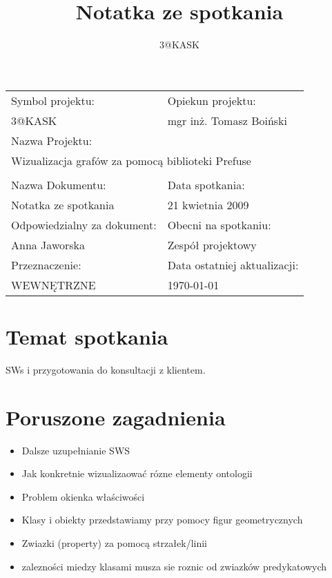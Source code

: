 \documentclass[a4paper,10pt]{article}
\title{Notatka ze spotkania}
\author{3@KASK}
\begin{document}



\maketitle


\begin{center}
\begin{tabular}{|p{7cm}|p{7cm}|}
\hline
Symbol projektu: & Opiekun projektu:   \tabularnewline 
3@KASK & mgr inż. Tomasz Boiński    \tabularnewline \hline
\multicolumn{2}{|l|}{Nazwa Projektu: } \tabularnewline
\multicolumn{2}{|l|}{Wizualizacja grafów za pomocą biblioteki Prefuse } \tabularnewline 
\hline
\multicolumn{2}{l}{ } \tabularnewline %
\hline 
Nazwa Dokumentu: & Data spotkania:   \tabularnewline 
Notatka ze spotkania & 21 kwietnia 2009 \tabularnewline \hline
Odpowiedzialny za dokument: & Obecni na spotkaniu:   \tabularnewline 
Anna Jaworska & Zespół projektowy \tabularnewline \hline
Przeznaczenie: & Data ostatniej aktualizacji:   \tabularnewline 
WEWNĘTRZNE & \today \tabularnewline \hline
\end{tabular}
\end{center}



\section{Temat spotkania}

SWs i przygotowania do konsultacji z klientem.

\section{Poruszone zagadnienia}

\begin{itemize}
 	\item Dalsze uzupełnianie SWS
	\item Jak konkretnie wizualizaować rózne elementy ontologii
	\item Problem okienka właściwości
	\item Klasy i obiekty przedstawiamy przy pomocy figur geometrycznych
	\item Zwiazki (property) za pomocą strzałek/linii
	\item zalezności miedzy klasami musza sie roznic od zwiazków predykatowych
	
\end{itemize}
\end{document}
